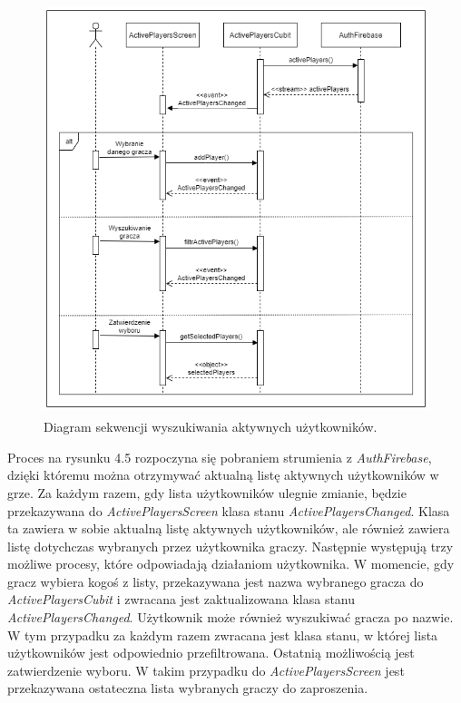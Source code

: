 \begin{figure}[h!]
	\begin{center}
		\includegraphics[width=14cm,height=12cm]{img/diagram-sekwencji-activePlayers.png}
	\end{center}
	\caption{{\color{dgray}Diagram sekwencji wyszukiwania aktywnych użytkowników.}} 
	\label{ActivePlayersCubit}
\end{figure}

Proces na rysunku 4.5 rozpoczyna się pobraniem strumienia z \emph{AuthFirebase}, dzięki któremu można otrzymywać aktualną listę aktywnych użytkowników w grze. Za każdym razem, gdy lista użytkowników ulegnie zmianie, będzie przekazywana do \emph{ActivePlayersScreen} klasa stanu \emph{ActivePlayersChanged}. Klasa ta zawiera w sobie aktualną listę aktywnych użytkowników, ale również zawiera listę dotychczas wybranych przez użytkownika graczy. Następnie występują trzy możliwe procesy, które odpowiadają działaniom użytkownika. W momencie, gdy gracz wybiera kogoś z listy, przekazywana jest nazwa wybranego gracza do \emph{ActivePlayersCubit} i zwracana jest zaktualizowana klasa stanu \emph{ActivePlayersChanged}. Użytkownik może również wyszukiwać gracza po nazwie. W tym przypadku za każdym razem zwracana jest klasa stanu, w której lista użytkowników jest odpowiednio przefiltrowana. Ostatnią możliwością jest zatwierdzenie wyboru. W takim przypadku do \emph{ActivePlayersScreen} jest przekazywana ostateczna lista wybranych graczy do zaproszenia. \vspace{4cm} \\

